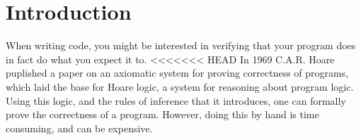 \section{Introduction}












When writing code, you might be interested in verifying that your program does in fact do what you expect it to. 
<<<<<<< HEAD
In 1969 C.A.R. Hoare puplished a paper on an axiomatic system for proving correctness of programs, which laid the base for Hoare logic, a system for reasoning about program logic\cite{Hoare}. Using this logic, and the rules of inference that it introduces, one can formally prove the correctness of a program.
However, doing this by hand is time consuming, and can be expensive. 

